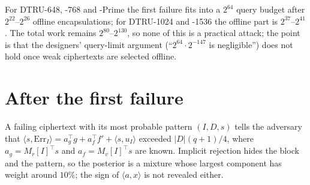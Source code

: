 \documentclass[11pt,a4paper]{article}
\theoremstyle{definition}
\theoremstyle{remark}
\newcommand{\Err}{\mathrm{Err}}
\begin{document}
\begin{table}[t]
\centering\small
{}
\caption{Offline precomputation ($\log_2\alpha^{-1}$ encapsulations) and
oracle queries ($\log_2\beta^{-1}$) under the normal-tail fit. For DTRU-648
the $2^{-80}$ threshold is inside the sample: two of 200 honest ciphertexts
have $p>2^{-80}$ (weakest $2^{-78.7}$). The $2^{64}$-cap entries for
DTRU-2048 and DTRU-Light are $9\sigma$ extrapolations.}
\label{tab:cap}
\end{table}

For DTRU-648, -768 and -Prime the first failure fits into a $2^{64}$ query
budget after $2^{22}$--$2^{26}$ offline encapsulations; for DTRU-1024 and
-1536 the offline part is $2^{37}$--$2^{41}$. The total work remains
$2^{80}$--$2^{130}$, so none of this is a practical attack; the point is
that the designers' query-limit argument (``$2^{64}\cdot 2^{-147}$ is
negligible'') does not hold once weak ciphertexts are selected offline.

\section{After the first failure}
\label{sec:after}

A failing ciphertext with its most probable pattern $(I,D,s)$ tells the
adversary that $\langle s,\Err_I\rangle=a_g^\top g+a_f^\top f'+\langle
s,u_I\rangle$ exceeded $|D|(q+1)/4$, where $a_g=M_r[I]^\top s$ and
$a_f=M_v[I]^\top s$ are known. Implicit rejection hides the block and the
pattern, so the posterior is a mixture whose largest component has weight
around $10\%$; the sign of $\langle a,x\rangle$ is not revealed either.
\end{document}
